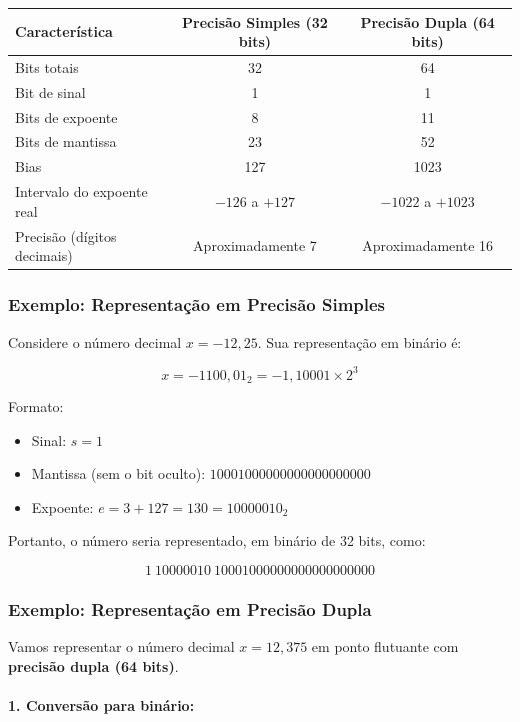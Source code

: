 \begin{center}
\begin{tabular}{|l|c|c|}
\hline
\textbf{Característica} & \textbf{Precisão Simples (32 bits)} & \textbf{Precisão Dupla (64 bits)} \\
\hline
Bits totais & 32 & 64 \\
\hline
Bit de sinal & 1 & 1 \\
\hline
Bits de expoente & 8 & 11 \\
\hline
Bits de mantissa & 23 & 52 \\
\hline
Bias & 127 & 1023 \\
\hline
Intervalo do expoente real & \(-126\) a \(+127\) & \(-1022\) a \(+1023\) \\
\hline
Precisão (dígitos decimais) & Aproximadamente 7 & Aproximadamente 16 \\
\hline
\end{tabular}
\end{center}

\subsubsection*{Exemplo: Representação em \textbf{Precisão Simples}}

Considere o número decimal \( x = -12{,}25 \). Sua representação em binário é:

\[
x = -1100{,}01_2 = -1{,}10001 \times 2^3
\]

Formato:

\begin{itemize}
  \item Sinal: \( s = 1 \)
  \item Mantissa (sem o bit oculto): \( 10001000000000000000000 \)
  \item Expoente: \( e = 3 + 127 = 130 = 10000010_2 \)
\end{itemize}

Portanto, o número seria representado, em binário de 32 bits, como:

\[
\boxed{1\ 10000010\ 10001000000000000000000}
\]
\subsubsection*{Exemplo: Representação em Precisão Dupla}

Vamos representar o número decimal \( x = 12{,}375 \) em ponto flutuante com \textbf{precisão dupla (64 bits)}.

\paragraph{1. Conversão para binário:}

